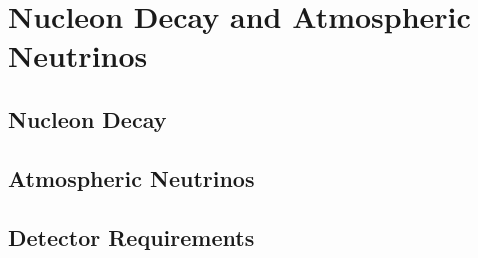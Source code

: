 \chapter{Nucleon Decay and Atmospheric Neutrinos}
\label{ch:physics-atmpdk}

\section{Nucleon Decay}
\label{sec:physics-atmpdk-ndk}

\section{Atmospheric Neutrinos}
\label{sec:physics-atmpdk-atmnu}

\section{Detector Requirements}
\label{sec:physics-atmpdk-detector-requirements}
